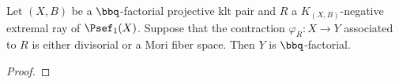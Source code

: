     \begin{proposition}\label{prop:divisorial_or_fibered_contraction_preverses_Q_factorial}
        Let \((X,B)\) be a \(\bbq\)-factorial projective klt pair and \(R\) a \(K_{(X,B)}\)-negative extremal ray of \(\Psef_1(X)\).
        Suppose that the contraction \(\varphi_R:X\to Y\) associated to \(R\) is either divisorial or a Mori fiber space. 
        Then \(Y\) is \(\bbq\)-factorial.
    \end{proposition}
    \begin{proof}
    \end{proof}

    